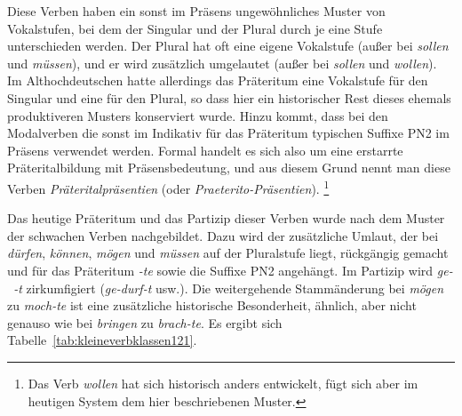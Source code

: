 Diese Verben haben ein sonst im Präsens ungewöhnliches Muster von Vokalstufen, bei dem der Singular und der Plural durch je eine Stufe unterschieden werden.
Der Plural hat oft eine eigene Vokalstufe (außer bei \textit{sollen} und \textit{müssen}), und er wird zusätzlich umgelautet (außer bei \textit{sollen} und \textit{wollen}).
Im Althochdeutschen hatte allerdings das Präteritum eine Vokalstufe für den Singular und eine für den Plural, so dass hier ein historischer Rest dieses ehemals produktiveren Musters konserviert wurde.
Hinzu kommt, dass bei den Modalverben die sonst im Indikativ für das Präteritum typischen Suffixe PN2 im Präsens verwendet werden.
Formal handelt es sich also um eine erstarrte Präteritalbildung mit Präsensbedeutung, und aus diesem Grund nennt man diese Verben \textit{Präteritalpräsentien} (oder \textit{Praeterito-Präsentien}).%
\footnote{Das Verb \textit{wollen} hat sich historisch anders entwickelt, fügt sich aber im heutigen System dem hier beschriebenen Muster.}

Das heutige Präteritum und das Partizip dieser Verben wurde nach dem Muster der schwachen Verben nachgebildet.
Dazu wird der zusätzliche Umlaut, der bei \textit{dürfen}, \textit{können}, \textit{mögen} und \textit{müssen} auf der Pluralstufe liegt, rückgängig gemacht und für das Präteritum \textit{-te} sowie die Suffixe PN2 angehängt.
Im Partizip wird \mbox{\textit{ge-~-t}} zirkumfigiert (\textit{ge-durf-t} usw.).
Die weitergehende Stammänderung bei \textit{mögen} zu \textit{moch-te} ist eine zusätzliche historische Besonderheit, ähnlich, aber nicht genauso wie bei \textit{bringen} zu \textit{brach-te}.
Es ergibt sich Tabelle~\ref{tab:kleineverbklassen121}.

\begin{table}[!htbp]
  \caption{Präteritum der Modalverben}
  \label{tab:kleineverbklassen121}
\end{table}

